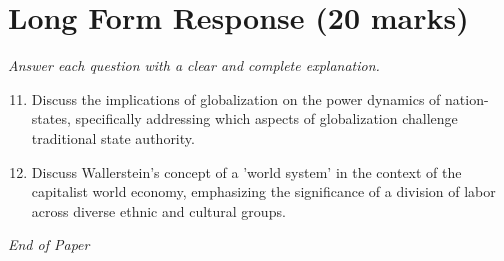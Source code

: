 \documentclass[12pt]{article}
\begin{document}
\section*{Long Form Response (20 marks)}
\textit{Answer each question with a clear and complete explanation.}
\begin{enumerate}[label=\arabic*.]
\setcounter{enumi}{10}
\item Discuss the implications of globalization on the power dynamics of nation-states, specifically addressing which aspects of globalization challenge traditional state authority.
\item Discuss Wallerstein's concept of a 'world system' in the context of the capitalist world economy, emphasizing the significance of a division of labor across diverse ethnic and cultural groups.
\end{enumerate}

\vfill
\noindent\textit{End of Paper}
\end{document}
